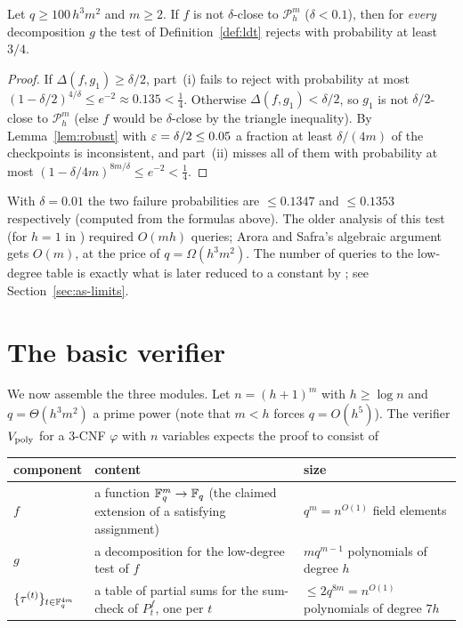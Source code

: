 \begin{corollary}\label{cor:ldt}
Let $q\ge100\,h^3m^2$ and $m\ge2$.  If $f$ is not $\delta$-close to $\mathcal P^m_h$ ($\delta<0.1$), then for \emph{every} decomposition $g$ the test of Definition~\ref{def:ldt} rejects with probability at least $3/4$.
\end{corollary}
\begin{proof}
If $\Delta(f,g_1)\ge\delta/2$, part~(i) fails to reject with probability at most $(1-\delta/2)^{4/\delta}\le e^{-2}\approx0.135<\tfrac14$.
Otherwise $\Delta(f,g_1)<\delta/2$, so $g_1$ is not $\delta/2$-close to $\mathcal P^m_h$ (else $f$ would be $\delta$-close by the triangle inequality).  By Lemma~\ref{lem:robust} with $\varepsilon=\delta/2\le0.05$ a fraction at least $\delta/(4m)$ of the
checkpoints is inconsistent, and part~(ii) misses all of them with probability at most $(1-\delta/4m)^{8m/\delta}\le e^{-2}<\tfrac14$.
\end{proof}

\begin{remark}
With $\delta=0.01$ the two failure probabilities are $\le0.1347$ and $\le0.1353$ respectively (computed from the formulas above).  The older analysis of this test (for $h=1$ in \citealp{FGLSS96}) required $O(mh)$ queries; Arora and Safra's algebraic argument gets $O(m)$, at the price of $q=\Omega(h^3m^2)$.  The number of queries to the low-degree table is exactly what is later
reduced to a constant by \citet{ALMSS98}; see Section~\ref{sec:as-limits}.
\end{remark}


\section{The basic verifier}
\label{sec:vpoly}

We now assemble the three modules.  Let $n=(h+1)^m$ with $h\ge\log n$ and $q=\Theta(h^3m^2)$ a prime power (note that $m<h$ forces $q=O(h^5)$).  The verifier $V_{\rm poly}$ for a $3$-CNF $\varphi$ with $n$ variables expects the proof to consist of

\begin{center}\small
\renewcommand{\arraystretch}{1.25}
\begin{tabular}{@{}>{\raggedright\arraybackslash}p{2.6cm}
                   >{\raggedright\arraybackslash}p{6.0cm}
                   >{\raggedright\arraybackslash}p{4.0cm}@{}}
\toprule
component & content & size\\
\midrule
$f$ & a function $\mathbb{F}_q^m\to\mathbb{F}_q$ (the claimed extension of a satisfying assignment) & $q^m=n^{O(1)}$ field elements\\
$g$ & a decomposition for the low-degree test of $f$ & $mq^{m-1}$ polynomials of degree $h$\\
$\{\tau^{(t)}\}_{t\in\mathbb{F}_q^{4m}}$ & a table of partial sums for the sum-check of $P_t^{f}$, one per $t$ & $\le2q^{8m}=n^{O(1)}$ polynomials of degree $7h$\\
\bottomrule
\end{tabular}
\end{center}

